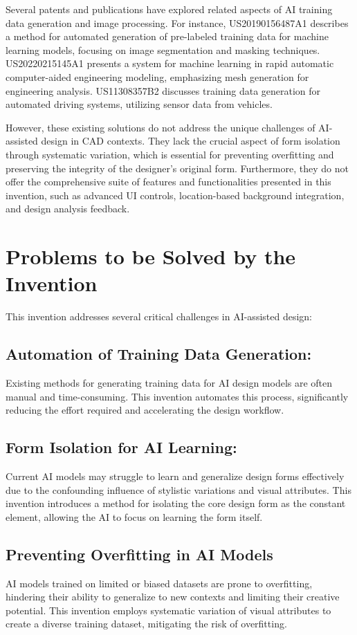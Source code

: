 \documentclass{article}
\begin{document}
Several patents and publications have explored related aspects of AI training data generation and image processing. For instance, US20190156487A1 describes a method for automated generation of pre-labeled training data for machine learning models, focusing on image segmentation and masking techniques. US20220215145A1 presents a system for machine learning in rapid automatic computer-aided engineering modeling, emphasizing mesh generation for engineering analysis. US11308357B2 discusses training data generation for automated driving systems, utilizing sensor data from vehicles.

However, these existing solutions do not address the unique challenges of AI-assisted design in CAD contexts. They lack the crucial aspect of form isolation through systematic variation, which is essential for preventing overfitting and preserving the integrity of the designer's original form. Furthermore, they do not offer the comprehensive suite of features and functionalities presented in this invention, such as advanced UI controls, location-based background integration, and design analysis feedback.

\section{Problems to be Solved by the Invention}

This invention addresses several critical challenges in AI-assisted design:

\subsection{Automation of Training Data Generation:}
Existing methods for generating training data for AI design models are often manual and time-consuming. This invention automates this process, significantly reducing the effort required and accelerating the design workflow.

\subsection{Form Isolation for AI Learning:}
Current AI models may struggle to learn and generalize design forms effectively due to the confounding influence of stylistic variations and visual attributes. This invention introduces a method for isolating the core design form as the constant element, allowing the AI to focus on learning the form itself.

\subsection{Preventing Overfitting in AI Models}
AI models trained on limited or biased datasets are prone to overfitting, hindering their ability to generalize to new contexts and limiting their creative potential. This invention employs systematic variation of visual attributes to create a diverse training dataset, mitigating the risk of overfitting.
\end{document}
